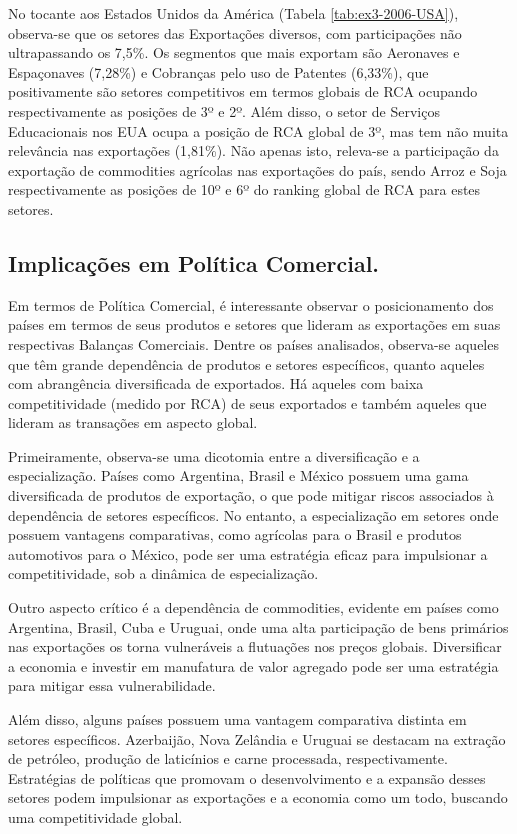 No tocante aos Estados Unidos da América (Tabela \ref{tab:ex3-2006-USA}), observa-se que os setores das Exportações diversos, com participações não ultrapassando os 7,5\%. Os segmentos que mais exportam são Aeronaves e Espaçonaves (7,28\%) e Cobranças pelo uso de Patentes (6,33\%), que positivamente são setores competitivos em termos globais de RCA ocupando respectivamente as posições de 3º e 2º. Além disso, o setor de Serviços Educacionais nos EUA ocupa a posição de RCA global de 3º, mas tem não muita relevância nas exportações (1,81\%). Não apenas isto, releva-se a participação da exportação de commodities agrícolas nas exportações do país, sendo Arroz e Soja respectivamente as posições de 10º e 6º do ranking global de RCA para estes setores.

\subsection{Implicações em Política Comercial.}


Em termos de Política Comercial, é interessante observar o posicionamento dos países em termos de seus produtos e setores que lideram as exportações em suas respectivas Balanças Comerciais. Dentre os países analisados, observa-se aqueles que têm grande dependência de produtos e setores específicos, quanto aqueles com abrangência diversificada de exportados. Há aqueles com baixa competitividade (medido por RCA) de seus exportados e também aqueles que lideram as transações em aspecto global.

Primeiramente, observa-se uma dicotomia entre a diversificação e a especialização. Países como Argentina, Brasil e México possuem uma gama diversificada de produtos de exportação, o que pode mitigar riscos associados à dependência de setores específicos. No entanto, a especialização em setores onde possuem vantagens comparativas, como agrícolas para o Brasil e produtos automotivos para o México, pode ser uma estratégia eficaz para impulsionar a competitividade, sob a dinâmica de especialização.

Outro aspecto crítico é a dependência de commodities, evidente em países como Argentina, Brasil, Cuba e Uruguai, onde uma alta participação de bens primários nas exportações os torna vulneráveis a flutuações nos preços globais. Diversificar a economia e investir em manufatura de valor agregado pode ser uma estratégia para mitigar essa vulnerabilidade.

Além disso, alguns países possuem uma vantagem comparativa distinta em setores específicos. Azerbaijão, Nova Zelândia e Uruguai se destacam na extração de petróleo, produção de laticínios e carne processada, respectivamente. Estratégias de políticas que promovam o desenvolvimento e a expansão desses setores podem impulsionar as exportações e a economia como um todo, buscando uma competitividade global.

